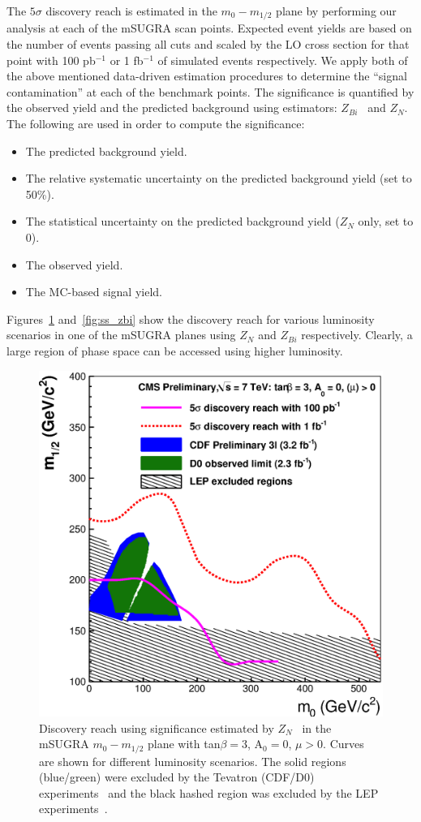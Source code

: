 The $5\sigma$  discovery reach is estimated in the $m_{0}-m_{1/2}$
plane by  performing our analysis at each of the  mSUGRA scan points.
Expected event yields are based on the number of events passing
all cuts and scaled by the LO cross section for that point with 100 pb$^{-1}$ or 1 fb$^{-1}$ 
of simulated events respectively. We apply both of the above mentioned data-driven 
estimation procedures to determine the ``signal contamination'' at each of the benchmark points. 
The significance is quantified by the observed yield and the predicted background
using estimators: $Z_{Bi}$~\cite{cite:cousins}  and $Z_{N}$\cite{cite:conway}. The following
are used in order to compute the significance:
\begin{itemize}
\item The predicted background yield.
\item The relative systematic  uncertainty on the predicted background
yield (set to 50\%).
\item The  statistical uncertainty  on the predicted  background yield
($Z_N$ only, set to 0).
\item The observed yield.
\item The MC-based signal yield.

\end{itemize}
Figures~\ref{fig:ss_zn} and~\ref{fig:ss_zbi} show the discovery reach for various 
luminosity scenarios in one of the mSUGRA planes using $Z_{N}$ and $Z_{Bi}$ respectively.
Clearly, a large region of phase space can be accessed using higher luminosity. 
\vspace{3 mm}
\begin{figure}[htb]
\begin{center}
\includegraphics[width=0.7\linewidth]{figs/massreachss_zn.eps}
\caption{Discovery reach using significance estimated by $Z_N$~\cite{cite:conway} 
in the mSUGRA $m_{0}-m_{1/2}$ plane with tan$\beta = 3$, A$_0 = 0$, $\mu > 0$. 
Curves are shown for different luminosity scenarios. The solid regions (blue/green) were excluded by 
the Tevatron (CDF/D0) experiments~\cite{cdf:recentSusy, d0:recentSusy} and the black hashed region was excluded by the LEP 
experiments~\cite{lep:lepsusyreach}.\label{fig:ss_zn}}
\end{center}
\end{figure}
